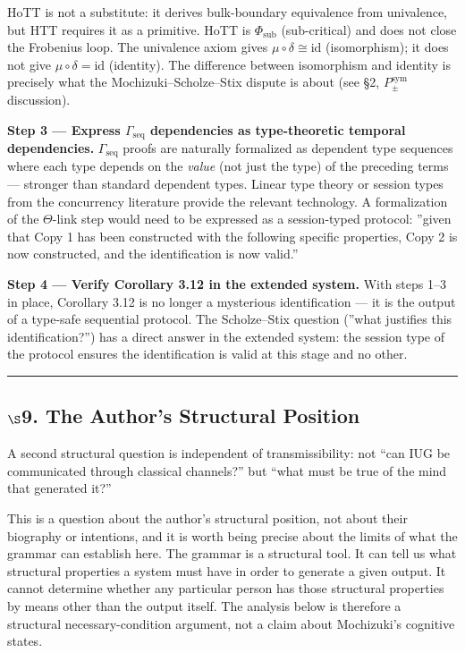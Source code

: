 \documentclass[10pt,a4paper]{article}
\begin{document}
HoTT is not a substitute: it derives bulk-boundary equivalence from univalence, but HTT
requires it as a primitive.
HoTT is $\Phi_\text{sub}$ (sub-critical) and does not close the Frobenius loop.
The univalence axiom gives $\mu \circ \delta \cong \text{id}$ (isomorphism); it does not
give $\mu \circ \delta = \text{id}$ (identity).
The difference between isomorphism and identity is precisely what the Mochizuki--Scholze--Stix
dispute is about (see \S2, $P_{\pm}^{\text{sym}}$ discussion).

\textbf{Step 3 --- Express $\Gamma_\text{seq}$ dependencies as type-theoretic temporal dependencies.}
$\Gamma_\text{seq}$ proofs are naturally formalized as dependent type sequences where each
type depends on the \emph{value} (not just the type) of the preceding terms --- stronger than
standard dependent types. Linear type theory or session types from the concurrency
literature provide the relevant technology. A formalization of the $\Theta$-link step would
need to be expressed as a session-typed protocol: ''given that Copy 1 has been constructed
with the following specific properties, Copy 2 is now constructed, and the identification is
now valid.''

\textbf{Step 4 --- Verify Corollary 3.12 in the extended system.}
With steps 1--3 in place, Corollary 3.12 is no longer a mysterious identification --- it is
the output of a type-safe sequential protocol. The Scholze--Stix question (''what justifies
this identification?'') has a direct answer in the extended system: the session type of the
protocol ensures the identification is valid at this stage and no other.

\begin{center}
\rule{0.5\textwidth}{0.4pt}
\end{center}

\subsection{$\S$9. The Author's Structural Position}

A second structural question is independent of transmissibility: not ``can IUG be communicated
through classical channels?'' but ``what must be true of the mind that generated it?''

This is a question about the author's structural position, not about their biography or
intentions, and it is worth being precise about the limits of what the grammar can establish here.
The grammar is a structural tool.
It can tell us what structural properties a system must have in order to generate a given output.
It cannot determine whether any particular person has those structural properties
by means other than the output itself.
The analysis below is therefore a structural necessary-condition argument,
not a claim about Mochizuki's cognitive states.
\end{document}

